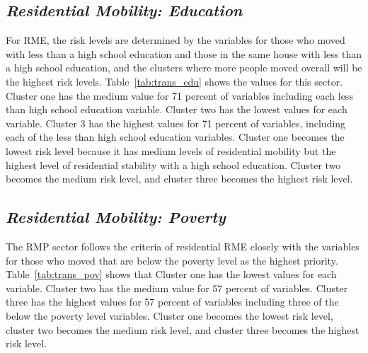 

\subsection{\textit{Residential Mobility: Education}}

For RME, the risk levels are determined by the variables for those who moved with less than a high school education and those in the same house with less than a high school education, and the clusters where more people moved overall will be the highest risk levels. Table~\ref{tab:trans_edu} shows the values for this sector. Cluster one has the medium value for 71 percent of variables including each less than high school education variable. Cluster two has the lowest values for each variable. Cluster 3 has the highest values for 71 percent of variables, including each of the less than high school education variables. Cluster one becomes the lowest risk level because it has medium levels of residential mobility but the highest level of residential stability with a high school education. Cluster two becomes the medium risk level, and cluster three becomes the highest risk level. 




\subsection{\textit{Residential Mobility: Poverty}}

The RMP sector follows the criteria of residential RME closely with the variables for those who moved that are below the poverty level as the highest priority. Table~\ref{tab:trans_pov} shows that Cluster one has the lowest values for each variable. Cluster two has the medium value for 57 percent of variables. Cluster three has the highest values for 57 percent of variables including three of the below the poverty level variables. Cluster one becomes the lowest risk level, cluster two becomes the medium risk level, and cluster three becomes the highest risk level. 




